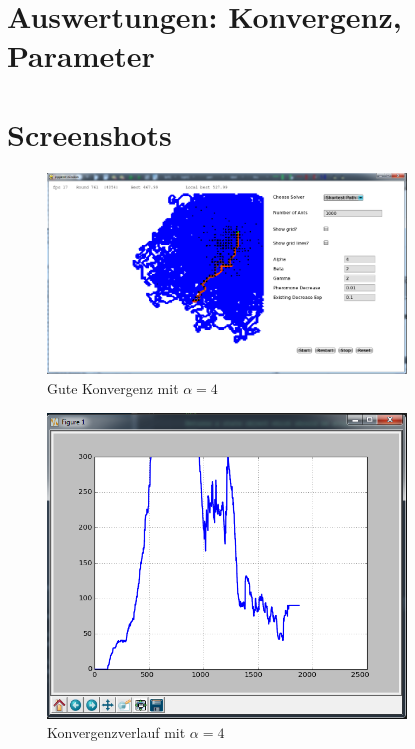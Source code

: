 \section{Auswertungen: Konvergenz, Parameter}

\section{Screenshots}

\begin{figure}[h]
  \centering
	\includegraphics [width=0.85\textwidth]{images/screenshots/good1.png} 
	\caption{Gute Konvergenz mit $\alpha = 4$}
\end{figure}

\begin{figure}[h]
  \centering
	\includegraphics [width=0.85\textwidth]{images/screenshots/good1_chart.png} 
	\caption{Konvergenzverlauf mit $\alpha = 4$}
\end{figure}

